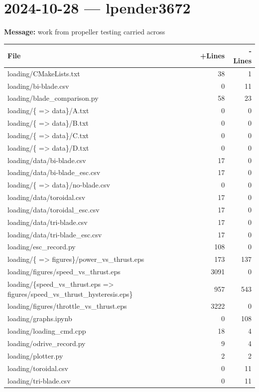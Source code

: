 \documentclass{article}
\begin{document}
\section*{2024-10-28 --- lpender3672}
\textbf{Message:} work from propeller testing carried across

\begin{longtable}{|p{10cm}|r|r|}
\hline \textbf{File} & \textbf{+Lines} & \textbf{-Lines} \\
\hline
loading/CMakeLists.txt & 38 & 1 \\
\hline
loading/bi-blade.csv & 0 & 11 \\
\hline
loading/blade\_comparison.py & 58 & 23 \\
\hline
loading/\{ => data\}/A.txt & 0 & 0 \\
\hline
loading/\{ => data\}/B.txt & 0 & 0 \\
\hline
loading/\{ => data\}/C.txt & 0 & 0 \\
\hline
loading/\{ => data\}/D.txt & 0 & 0 \\
\hline
loading/data/bi-blade.csv & 17 & 0 \\
\hline
loading/data/bi-blade\_esc.csv & 17 & 0 \\
\hline
loading/\{ => data\}/no-blade.csv & 0 & 0 \\
\hline
loading/data/toroidal.csv & 17 & 0 \\
\hline
loading/data/toroidal\_esc.csv & 17 & 0 \\
\hline
loading/data/tri-blade.csv & 17 & 0 \\
\hline
loading/data/tri-blade\_esc.csv & 17 & 0 \\
\hline
loading/esc\_record.py & 108 & 0 \\
\hline
loading/\{ => figures\}/power\_vs\_thrust.eps & 173 & 137 \\
\hline
loading/figures/speed\_vs\_thrust.eps & 3091 & 0 \\
\hline
loading/\{speed\_vs\_thrust.eps => figures/speed\_vs\_thrust\_hysteresis.eps\} & 957 & 543 \\
\hline
loading/figures/throttle\_vs\_thrust.eps & 3222 & 0 \\
\hline
loading/graphs.ipynb & 0 & 108 \\
\hline
loading/loading\_cmd.cpp & 18 & 4 \\
\hline
loading/odrive\_record.py & 9 & 4 \\
\hline
loading/plotter.py & 2 & 2 \\
\hline
loading/toroidal.csv & 0 & 11 \\
\hline
loading/tri-blade.csv & 0 & 11 \\
\hline
\end{longtable}
\end{document}
